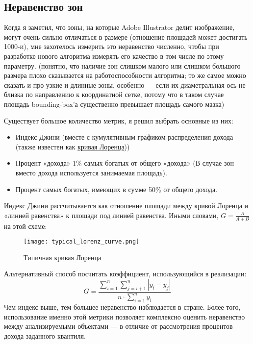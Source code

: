 \subsection{Неравенство зон}\label{subsec:inequality}
Когда я заметил, что зоны, на которые Adobe Illustrator делит изображение, могут очень сильно отличаться в размере (отношение площадей может достигать 1000-и),
мне захотелось измерить это неравенство численно, чтобы при разработке нового алгоритма измерять его качество в том числе по этому параметру.
(понятно, что наличие зон слишком малого или слишком большого размера плохо сказывается на работоспособности алгоритма;
то же самое можно сказать и про узкие и длинные зоны,
особенно — если их диаметральная ось не близка по направлению к координатной сетке,
потому что в таком случае площадь bounding-box'а существенно превышает площадь самого мазка)

Существует большое количество метрик, я решил выбрать основные из них:
\begin{itemize}
    \item Индекс Джини (вместе с кумулятивным графиком распределения дохода (также известен как \href{https://en.wikipedia.org/wiki/Lorenz_curve}{кривая Лоренца}))
    \item Процент «дохода» 1\% самых богатых от общего «дохода» (В случае зон вместо дохода используется занимаемая площадь).
    \item Процент самых богатых, имеющих в сумме 50\% от общего дохода.
\end{itemize}

Индекс Джини рассчитывается как отношение площади между кривой Лоренца и «линией равенства» к площади под линией равенства.
Иными словами, $G = \frac{A}{A + B}$ на этой схеме:

\begin{figure}[h!]\label{fig:lorenz_curve}
    \centering
    \texttt{[image: typical\_lorenz\_curve.png]}
    \caption{Типичная кривая Лоренца}
\end{figure}
\FloatBarrier

Альтернативный способ посчитать коэффициент, использующийся в реализации:
\begin{equation}
    G = \frac{\sum_{i=1}^{n}  \sum_{j=i+1}^{n}  \left| y_i - y_j \right|}{n \cdot \sum_{i=1}^{n} y_i}
\end{equation}
Чем индекс выше, тем большее неравенство наблюдается в стране.
Более того, использование именно этой метрики позволяет комплексно оценить неравенство между анализируемыми объектами —
в отличие от рассмотрения процентов дохода заданного квантиля.


